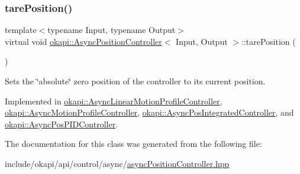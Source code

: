 \subsubsection{\texorpdfstring{tarePosition()}{tarePosition()}}
{\footnotesize\ttfamily template$<$typename Input, typename Output$>$ \\
virtual void \mbox{\hyperlink{classokapi_1_1AsyncPositionController}{okapi\+::\+Async\+Position\+Controller}}$<$ Input, Output $>$\+::tare\+Position (\begin{DoxyParamCaption}{ }\end{DoxyParamCaption})\hspace{0.3cm}{\ttfamily [pure virtual]}}

Sets the \char`\"{}absolute\char`\"{} zero position of the controller to its current position. 

Implemented in \mbox{\hyperlink{classokapi_1_1AsyncLinearMotionProfileController_a6cfe67f9e4db556fbed1f2c4c4252b0a}{okapi\+::\+Async\+Linear\+Motion\+Profile\+Controller}}, \mbox{\hyperlink{classokapi_1_1AsyncMotionProfileController_afc3476c87e3428f9f166273688e45249}{okapi\+::\+Async\+Motion\+Profile\+Controller}}, \mbox{\hyperlink{classokapi_1_1AsyncPosIntegratedController_a5fa801adbb46287423c5baae82f75924}{okapi\+::\+Async\+Pos\+Integrated\+Controller}}, and \mbox{\hyperlink{classokapi_1_1AsyncPosPIDController_a4d5bb5646dcdc3bc80f15c1d6ae72747}{okapi\+::\+Async\+Pos\+P\+I\+D\+Controller}}.



The documentation for this class was generated from the following file\+:\begin{DoxyCompactItemize}
\item 
include/okapi/api/control/async/\mbox{\hyperlink{asyncPositionController_8hpp}{async\+Position\+Controller.\+hpp}}\end{DoxyCompactItemize}
